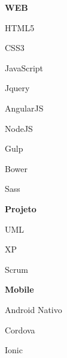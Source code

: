 \documentclass[paper=a4,fontsize=14pt]{article}
\let\olditemize\itemize
\let\endolditemize\enditemize
\renewenvironment{itemize}{%
    \small
    \olditemize
}{%
    \endolditemize
}
\begin{document}
\begin{multicols}{3}[]
\begin{itemize}[nolistsep]
    \item[] \hspace{-0.5cm} \textbf{WEB}
    \item HTML5
    \item CSS3
    \item JavaScript 
    \item Jquery 
    \item AngularJS 
    \item NodeJS 
    \item Gulp 
    \item Bower
    \item Sass
\end{itemize}

\columnbreak
\begin{itemize}[nolistsep]
    \item[] \hspace{-0.5cm} \textbf{Projeto}
    \item UML
    \item XP
    \item Scrum 
\end{itemize}

\columnbreak
\begin{itemize}[nolistsep]
    \item[] \hspace{-0.5cm} \textbf{Mobile}
    \item Android Nativo 
    \item Cordova 
    \item Ionic    
\end{itemize}
\end{multicols}
\end{document}
